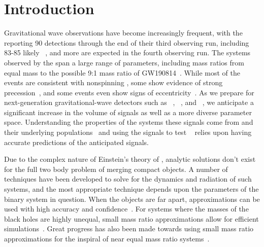 \documentclass[
twocolumn,prd,
showpacs,
nofootinbib,
amsmath,amssymb,
superscriptaddress]{revtex4-1}
\begin{document}
\section{Introduction}\label{sec:introduction}
Gravitational wave observations have become increasingly frequent, with the \lvk{} reporting 90 detections through the end of their third observing run, including 83-85 likely ~\cite{LIGOScientific:2021djp, LIGOScientific:2021usb,LIGOScientific:2020ibl, LIGOScientific:2018mvr}, and more are expected in the fourth observing run.
The \bbh{} systems observed by the \lvk{} span a large range of parameters, including mass ratios from equal mass to the possible %
9:1 mass ratio of GW190814~\cite{LIGOScientific:2020zkf}.
While most of the events are consistent with nonspinning , some show evidence of strong precession~\cite{LIGOScientific:2021djp}, and some  events even show signs of eccentricity~\cite{Gayathri:2020coq, Romero-Shaw:2021ual}.
As we prepare for next-generation gravitational-wave detectors such as \lisa{}~\cite{2019arXiv190706482B, 2017arXiv170200786A, Robson_2019}, \et{}~\cite{Punturo:2010zz, 2011einstein}, and \ce{}~\cite{2021arXiv210909882E}, we anticipate a significant increase in the volume of signals as well as a more diverse parameter space. 
Understanding the properties of the systems these signals come from and their underlying populations~\cite{LIGOScientific:2020kqk} and  using the signals to test \gr{}~\cite{LIGOScientific:2021sio} relies upon having accurate predictions of the anticipated signals.

Due to the complex nature of Einstein's theory of \gr{}, analytic solutions don't exist for the full two body problem of merging compact objects.
A number of techniques have been developed to solve for the dynamics and radiation of such systems, and the most appropriate technique depends upon the parameters of the binary system in question.
When the objects are far apart, \pn{} approximations can be used with high accuracy and confidence~\cite{Isoyama:2020lls, Blanchet:2013haa, Schafer:2018kuf, Futamase:2007zz, Blanchet:2008je, Faye:2012we, Faye:2014fra}.
For systems where the masses of the black holes are highly unequal, small mass ratio approximations allow for efficient simulations~\cite{Hinderer:2008dm, Miller:2020bft, Barack:2018yvs}.
Great progress has also been made towards using small mass ratio approximations for the inspiral of near equal mass ratio systems~\cite{vandeMeent:2020xgc, Wardell:2021fyy,Warburton:2021kwk, Albertini:2022rfe, Albertini:2022dmc}.
\end{document}
